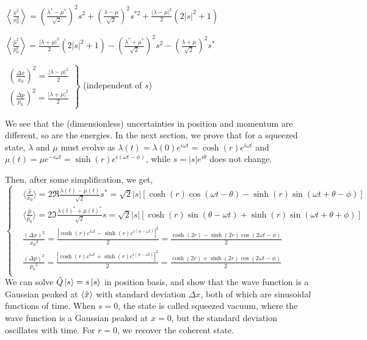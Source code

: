 \documentclass[12pt, twoside]{article}
\begin{document}
$\left\langle \frac { \hat{x} ^ { 2 } } { x_0 ^ { 2 } } \right\rangle = \left( \frac { \lambda ^ { * } - \mu ^ { * } } { \sqrt { 2 } } \right) ^ { 2 } s ^ { 2 } + \left( \frac { \lambda - \mu } { \sqrt { 2 } } \right) ^ { 2 } s ^ { *2 } + \frac { |\lambda - \mu| ^ { 2 } } { 2 } ( 2|s|^2+1 )$

$\left\langle \frac { \hat{p}^2 } { p_0 ^ 2 } \right\rangle  = \frac { | \lambda + \mu | ^ { 2 } } { 2 } \left( 2 | s | ^ { 2 } + 1 \right) - \left( \frac { \lambda^* + \mu ^ { * } } { \sqrt { 2 } } \right) ^ { 2 } s ^ { 2 } - \left( \frac { \lambda + \mu } { \sqrt { 2 } } \right) ^ { 2 } s ^ { * }$


$\left.\begin{array} { l } { \left(\frac{\Delta x}{x_0}\right)^2 = \frac{|\lambda - \mu|^2}{2} } \\ { \left(\frac{\Delta p}{p_0}\right)^2 = \frac{|\lambda + \mu|^2}{2} } \end{array} \right\}$ (independent of $s$)

We see that the (dimensionless) uncertainties in position and momentum are different, so are the energies.
In the next section, we prove that for a squeezed state, $\lambda$ and $\mu$ must evolve as $\lambda(t) = \lambda(0) e^{i\omega t} = \cosh(r) e^{i\omega t}$ and $\mu(t) = \mu e^{-i\omega t} = \sinh(r) e^{i(\omega t - \phi)}$, while $s = |s| e^{i\theta}$ does not change.

Then, after some simplification, we get, 
\begin{equation}
\begin{cases}

&{ \langle \frac{\hat{x}}{x_0} \rangle =2\Re{\frac{\lambda(t) - \mu(t)}{\sqrt{2}}s^*}=\sqrt{2}|s|[\cosh(r)\cos(\omega t - \theta) - \sinh(r)\sin(\omega t + \theta - \phi)]}\\
&{ \langle \frac{\hat{p}}{p_0} \rangle =2\Im{\frac{\lambda(t)^* + \mu(t)^*}{\sqrt{2}}s}=\sqrt{2}|s|[\cosh(r)\sin(\theta - \omega t) + \sinh(r)\sin(\omega t + \theta + \phi)]}\\
& { \frac{(\Delta x)^2}{{x_0}^2} = \frac { |\cosh(r)e^{i\omega t} - \sinh(r)e^{i(\phi - \omega t)}|^2 } { 2 } =  \frac{\cosh(2r) - \sinh(2r)\cos(2\omega t-\phi) }{2} }\\
& { \frac{(\Delta p)^2}{{p_0}^2} = \frac { |\cosh(r)e^{i\omega t} + \sinh(r)e^{i(\phi - \omega t)}|^2 } { 2 } =  \frac{\cosh(2r) + \sinh(2r)\cos(2\omega t-\phi) }{2} }\\

\end{cases}\end{equation}
We can solve $\hat{Q}\ket{s} = s\ket{s}$ in position basis, and show that the wave function is a Gaussian peaked at $\expval{\hat{x}}$ with standard deviation $\Delta x$, both of which are sinusoidal functions of time. When $s=0$, the state is called squeezed vacuum, where the wave function is a Gaussian peaked at $x=0$, but the standard deviation oscillates with time. For $r = 0$, we recover the coherent state.
\end{document}
